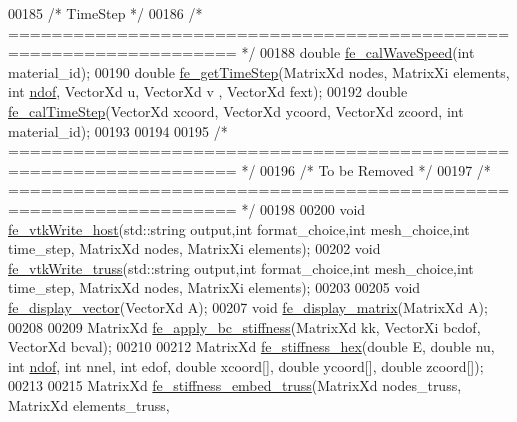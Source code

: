 \begin{DoxyCode}
00185 \textcolor{comment}{/* TimeStep */}
00186 \textcolor{comment}{/* =================================================================== */}
00188 \textcolor{keywordtype}{double} \hyperlink{functions_8h_a20aed1a2d3d8b470592491a96e60be87}{fe\_calWaveSpeed}(\textcolor{keywordtype}{int} material\_id);
00190 \textcolor{keywordtype}{double} \hyperlink{functions_8h_a537640b537f4b485607b062f2c25d974}{fe\_getTimeStep}(MatrixXd nodes, MatrixXi elements, \textcolor{keywordtype}{int} \hyperlink{_global_variables_8h_aa789fe4d8a13fd0990b630909430d5d0}{ndof}, VectorXd u, VectorXd v
      , VectorXd fext);
00192 \textcolor{keywordtype}{double} \hyperlink{functions_8h_a295b08cc71d5af080f0450614a01a4e6}{fe\_calTimeStep}(VectorXd xcoord, VectorXd ycoord, VectorXd zcoord, \textcolor{keywordtype}{int} material\_id);
00193 
00194 
00195 \textcolor{comment}{/* =================================================================== */}
00196 \textcolor{comment}{/* To be Removed */}
00197 \textcolor{comment}{/* =================================================================== */}
00198 
00200 \textcolor{keywordtype}{void} \hyperlink{functions_8h_ae02497eb9e23d26212b7a1301fc5b04b}{fe\_vtkWrite\_host}(std::string output,\textcolor{keywordtype}{int} format\_choice,\textcolor{keywordtype}{int} mesh\_choice,\textcolor{keywordtype}{int} time\_step,
      MatrixXd nodes, MatrixXi elements);
00202 \textcolor{keywordtype}{void} \hyperlink{functions_8h_a35bde18dc6d9d842ff0bec995327d441}{fe\_vtkWrite\_truss}(std::string output,\textcolor{keywordtype}{int} format\_choice,\textcolor{keywordtype}{int} mesh\_choice,\textcolor{keywordtype}{int} time\_step,
      MatrixXd nodes, MatrixXi elements);
00203 
00205 \textcolor{keywordtype}{void} \hyperlink{functions_8h_ab3e39c6d01b6fd10c9e264731cef75dc}{fe\_display\_vector}(VectorXd A);
00207 \textcolor{keywordtype}{void} \hyperlink{functions_8h_a5110a192d089c6b26744b9e9d67a7c2d}{fe\_display\_matrix}(MatrixXd A);
00208 
00209 MatrixXd \hyperlink{functions_8h_a3c73fda948017ac96aeb19889cfc1cba}{fe\_apply\_bc\_stiffness}(MatrixXd kk, VectorXi bcdof, VectorXd bcval);
00210 
00212 MatrixXd \hyperlink{functions_8h_a9378d4fc517465015411134456235a76}{fe\_stiffness\_hex}(\textcolor{keywordtype}{double} E, \textcolor{keywordtype}{double} nu, \textcolor{keywordtype}{int} \hyperlink{_global_variables_8h_aa789fe4d8a13fd0990b630909430d5d0}{ndof}, \textcolor{keywordtype}{int} nnel, \textcolor{keywordtype}{int} edof, \textcolor{keywordtype}{double} 
      xcoord[], \textcolor{keywordtype}{double} ycoord[], \textcolor{keywordtype}{double} zcoord[]);
00213 
00215 MatrixXd \hyperlink{functions_8h_ab3798340a27f0972299b3820aab0ccba}{fe\_stiffness\_embed\_truss}(MatrixXd nodes\_truss, MatrixXd elements\_truss, \textcolor{keywordtype}{
}
\end{DoxyCode}
